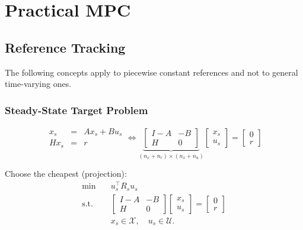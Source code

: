 \section{Practical MPC}
\subsection{Reference Tracking}The following concepts apply to piecewise constant references and not to general time-varying ones.

\subsubsection{Steady-State Target Problem}
\noindent
\begin{equation*}
    \begin{array}{rcl}
        x_s  & = & Ax_s +Bu_s \\
        Hx_s & = & r
    \end{array}
    \Leftrightarrow
    \underbrace{\begin{bmatrix}
            I-A & -B \\
            H   & 0
        \end{bmatrix}}_{(n_x + n_r)\times(n_x + n_u)}
    \begin{bmatrix}
        x_s \\
        u_s
    \end{bmatrix}
    = \begin{bmatrix}
        0 \\
        r
    \end{bmatrix}
\end{equation*}


Choose the cheapest (projection):
\begin{align*}
    \min\quad    & u_s^\top R_s u_s                                \\
    \text{s.t. } & \begin{bmatrix}
                       I-A & -B \\
                       H   & 0
                   \end{bmatrix}
    \begin{bmatrix}
        x_s \\
        u_s
    \end{bmatrix}
    = \begin{bmatrix}
          0 \\
          r
      \end{bmatrix}                                               \\
                 & x_s \in \mathcal{X}, \quad u_s \in \mathcal{U}.
\end{align*}

